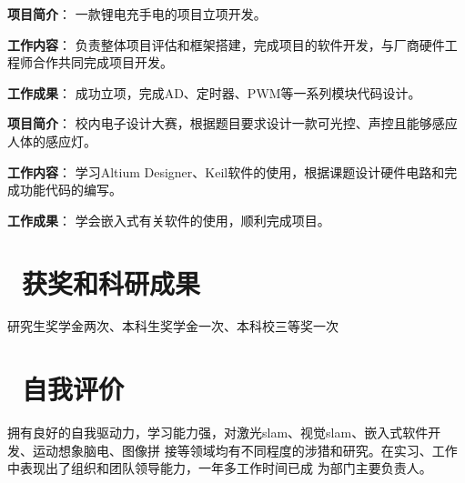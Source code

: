 \documentclass{resume}
\begin{document}
\textcolor[RGB]{80,100,190}{\textbf{项目简介}}：
一款锂电充手电的项目立项开发。

\textcolor[RGB]{80,100,190}{\textbf{工作内容}}：
负责整体项目评估和框架搭建，完成项目的软件开发，与厂商硬件工程师合作共同完成项目开发。

\textcolor[RGB]{80,100,190}{\textbf{工作成果}}：
成功立项，完成AD、定时器、PWM等一系列模块代码设计。


\textcolor[RGB]{80,100,190}{\textbf{项目简介}}：
校内电子设计大赛，根据题目要求设计一款可光控、声控且能够感应人体的感应灯。

\textcolor[RGB]{80,100,190}{\textbf{工作内容}}：
学习Altium Designer、Keil软件的使用，根据课题设计硬件电路和完成功能代码的编写。

\textcolor[RGB]{80,100,190}{\textbf{工作成果}}：
学会嵌入式有关软件的使用，顺利完成项目。
\section{\textcolor[RGB]{50,50,190}{\faPaperPlane\ 获奖和科研成果}}
研究生奖学金两次、本科生奖学金一次、本科校三等奖一次
\section{\textcolor[RGB]{50,50,190}{\faChild\ 自我评价}}
拥有良好的自我驱动力，学习能力强，对激光slam、视觉slam、嵌入式软件开发、运动想象脑电、图像拼
接等领域均有不同程度的涉猎和研究。在实习、工作中表现出了组织和团队领导能力，一年多工作时间已成
为部门主要负责人。



%
%
\end{document}
